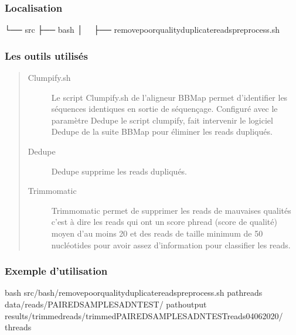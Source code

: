 \documentclass[letterpaper,10pt,french]{sphinxmanual}
\begin{document}
\subsubsection{Localisation}
\label{\detokenize{tutorial:localisation}}
\begin{sphinxVerbatim}[commandchars=\\\{\}]
└── src
 ├── bash
 │   ├── remove\PYGZus{}poor\PYGZus{}quality\PYGZus{}duplicate\PYGZus{}reads\PYGZus{}preprocess.sh
\end{sphinxVerbatim}


\subsubsection{Les outils utilisés}
\label{\detokenize{tutorial:les-outils-utilises}}\begin{quote}\begin{description}
\item[{Clumpify.sh}] \leavevmode
Le script Clumpify.sh de l’aligneur BBMap permet d’identifier les séquences identiques en sortie de séquençage. Configuré avec le paramètre Dedupe le script clumpify, fait intervenir le logiciel Dedupe de la suite BBMap pour éliminer les reads dupliqués.

\item[{Dedupe}] \leavevmode
Dedupe supprime les reads dupliqués.

\item[{Trimmomatic}] \leavevmode
Trimmomatic permet de supprimer les reads de mauvaises qualités c’est à dire les reads qui ont un score phread (score de qualité) moyen d’au moins 20 et des reads de taille minimum de 50 nucléotides pour avoir assez d’information pour classifier les reads.

\end{description}\end{quote}


\subsubsection{Exemple d’utilisation}
\label{\detokenize{tutorial:exemple-d-utilisation}}
\begin{sphinxVerbatim}[commandchars=\\\{\}]
bash src/bash/remove\PYGZus{}poor\PYGZus{}quality\PYGZus{}duplicate\PYGZus{}reads\PYGZus{}preprocess.sh 
             \PYGZhy{}path\PYGZus{}reads data/reads/PAIRED\PYGZus{}SAMPLES\PYGZus{}ADN\PYGZus{}TEST/ 
             \PYGZhy{}path\PYGZus{}output results/trimmed\PYGZus{}reads/trimmed\PYGZus{}PAIRED\PYGZus{}SAMPLES\PYGZus{}ADN\PYGZus{}TEST\PYGZus{}reads\PYGZus{}04\PYGZus{}06\PYGZus{}2020/ 
             \PYGZhy{}threads 
\end{sphinxVerbatim}
\end{document}
